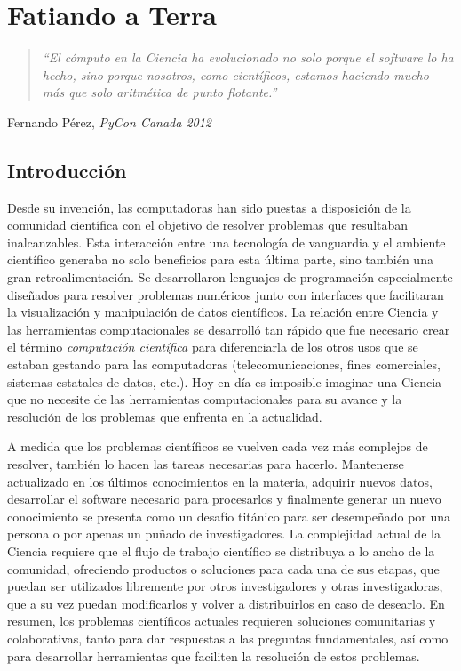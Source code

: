 \chapter{Fatiando a Terra}

\begin{quotation}
    \textit{%
    ``El cómputo en la Ciencia ha evolucionado no solo porque el software lo ha
    hecho, sino porque nosotros, como científicos, estamos haciendo mucho más
    que solo aritmética de punto flotante.''
    }
\end{quotation}
\begin{flushright}
Fernando Pérez, \textit{PyCon Canada 2012}
\end{flushright}

\section{Introducción}

Desde su invención, las computadoras han sido puestas a disposición de la
comunidad científica con el objetivo de resolver problemas que resultaban
inalcanzables.
Esta interacción entre una tecnología de vanguardia y el ambiente científico
generaba no solo beneficios para esta última parte, sino también una gran
retroalimentación.
Se desarrollaron lenguajes de programación especialmente diseñados para
resolver problemas numéricos junto con interfaces que facilitaran la
visualización y manipulación de datos científicos.
La relación entre Ciencia y las herramientas computacionales se desarrolló tan
rápido que fue necesario crear el término \emph{computación científica} para
diferenciarla de los otros usos que se estaban gestando para las computadoras
(telecomunicaciones, fines comerciales, sistemas estatales de datos, etc.).
Hoy en día es imposible imaginar una Ciencia que no necesite de las
herramientas computacionales para su avance y la resolución de los problemas
que enfrenta en la actualidad.

A medida que los problemas científicos se vuelven cada vez más complejos de
resolver,
también lo hacen las tareas necesarias para hacerlo.
Mantenerse actualizado en los últimos conocimientos en la materia, adquirir
nuevos datos, desarrollar el software necesario para procesarlos y finalmente
generar un nuevo conocimiento se presenta como un desafío titánico para ser
desempeñado por una persona o por apenas un puñado de investigadores.
La complejidad actual de la Ciencia requiere que el flujo de trabajo científico
se distribuya a lo ancho de la comunidad, ofreciendo productos o soluciones
para cada una de sus etapas, que puedan ser utilizados libremente por otros
investigadores y otras investigadoras, que a su vez puedan modificarlos
y volver a distribuirlos en caso de desearlo.
En resumen, los problemas científicos actuales requieren soluciones
comunitarias y colaborativas, tanto para dar respuestas a las preguntas
fundamentales, así como para desarrollar herramientas que faciliten la
resolución de estos problemas.

